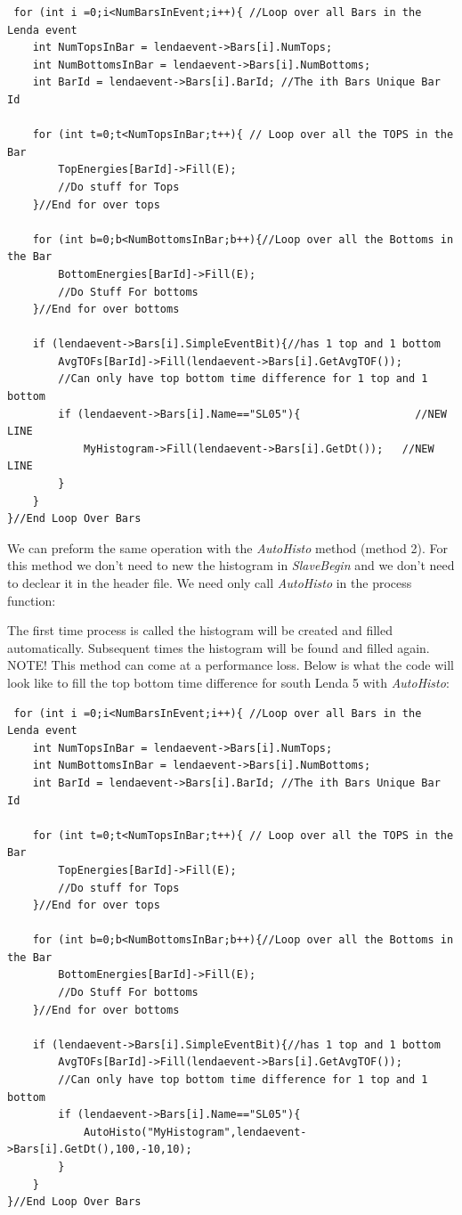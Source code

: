 \documentclass[paper=a4, fontsize=12pt]{scrartcl} %
\numberwithin{equation}{section} %
\numberwithin{figure}{section} %
\numberwithin{table}{section} %
\newcommand{\example}[1]{\begin{center} \fbox{#1} \end{center}}
\begin{document}
\begin{lstlisting}
 for (int i =0;i<NumBarsInEvent;i++){ //Loop over all Bars in the Lenda event
    int NumTopsInBar = lendaevent->Bars[i].NumTops;
    int NumBottomsInBar = lendaevent->Bars[i].NumBottoms;
    int BarId = lendaevent->Bars[i].BarId; //The ith Bars Unique Bar Id

	for (int t=0;t<NumTopsInBar;t++){ // Loop over all the TOPS in the Bar
		TopEnergies[BarId]->Fill(E);
		//Do stuff for Tops
	}//End for over tops

	for (int b=0;b<NumBottomsInBar;b++){//Loop over all the Bottoms in the Bar
		BottomEnergies[BarId]->Fill(E);
		//Do Stuff For bottoms
	}//End for over bottoms

	if (lendaevent->Bars[i].SimpleEventBit){//has 1 top and 1 bottom
		AvgTOFs[BarId]->Fill(lendaevent->Bars[i].GetAvgTOF());
		//Can only have top bottom time difference for 1 top and 1 bottom
		if (lendaevent->Bars[i].Name=="SL05"){                  //NEW LINE
			MyHistogram->Fill(lendaevent->Bars[i].GetDt());   //NEW LINE
		}
	}
}//End Loop Over Bars
\end{lstlisting}

We can preform the same operation with the \textit{AutoHisto} method (method 2).  For this method we don't need to new the histogram in \textit{SlaveBegin} and we don't need to declear it in the header file.  We need only call \textit{AutoHisto} in the process function:

\example{AutoHisto("name",value,nBins,xlow,xhigh)}

The first time process is called the histogram will be created and filled automatically.  Subsequent times the histogram will be found and filled again.  NOTE! This method can come at a performance loss.  Below is what the code will look like to fill the top bottom time difference for south Lenda 5 with \textit{AutoHisto}:

\begin{lstlisting}
 for (int i =0;i<NumBarsInEvent;i++){ //Loop over all Bars in the Lenda event
    int NumTopsInBar = lendaevent->Bars[i].NumTops;
    int NumBottomsInBar = lendaevent->Bars[i].NumBottoms;
    int BarId = lendaevent->Bars[i].BarId; //The ith Bars Unique Bar Id

	for (int t=0;t<NumTopsInBar;t++){ // Loop over all the TOPS in the Bar
		TopEnergies[BarId]->Fill(E);
		//Do stuff for Tops
	}//End for over tops

	for (int b=0;b<NumBottomsInBar;b++){//Loop over all the Bottoms in the Bar
		BottomEnergies[BarId]->Fill(E);
		//Do Stuff For bottoms
	}//End for over bottoms

	if (lendaevent->Bars[i].SimpleEventBit){//has 1 top and 1 bottom
		AvgTOFs[BarId]->Fill(lendaevent->Bars[i].GetAvgTOF());
		//Can only have top bottom time difference for 1 top and 1 bottom
		if (lendaevent->Bars[i].Name=="SL05"){
			AutoHisto("MyHistogram",lendaevent->Bars[i].GetDt(),100,-10,10);
		}
	}
}//End Loop Over Bars
\end{lstlisting}
\end{document}
